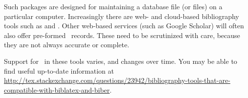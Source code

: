 Such packages are designed for maintaining a database file (or files)
on a particular computer. Increasingly there are web- and cloud-based
bibliography tools such as  and .
Other web-based services (such as Google Scholar) will often also
offer pre-formed \bibtex\ records. These need to be scrutinized with
care, because they are not always accurate or complete.

Support for \biblatex\ in these tools varies, and changes over
time. You may be able to find useful up-to-date information at
\url{http://tex.stackexchange.com/questions/23942/bibliography-tools-that-are-compatible-with-biblatex-and-biber}.

